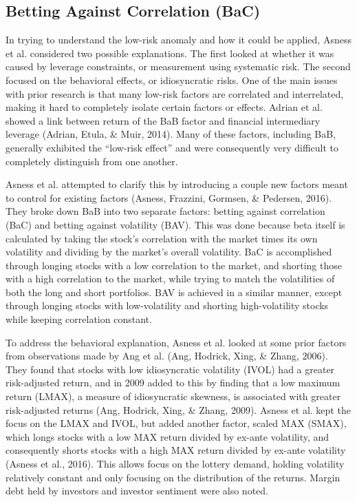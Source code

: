 \documentclass[12pt,twoside]{reedthesis}
\theoremstyle{definition}
\theoremstyle{definition}
\theoremstyle{definition}
\theoremstyle{remark}
\begin{document}
\subsection{Betting Against Correlation
(BaC)}\label{betting-against-correlation-bac}

In trying to understand the low-risk anomaly and how it could be
applied, Asness et al. considered two possible explanations. The first
looked at whether it was caused by leverage constraints, or measurement
using systematic risk. The second focused on the behavioral effects, or
idiosyncratic risks. One of the main issues with prior research is that
many low-risk factors are correlated and interrelated, making it hard to
completely isolate certain factors or effects. Adrian et al. showed a
link between return of the BaB factor and financial intermediary
leverage (Adrian, Etula, \& Muir, 2014). Many of these factors,
including BaB, generally exhibited the ``low-risk effect'' and were
consequently very difficult to completely distinguish from one another.

Asness et al. attempted to clarify this by introducing a couple new
factors meant to control for existing factors (Asness, Frazzini,
Gormsen, \& Pedersen, 2016). They broke down BaB into two separate
factors: betting against correlation (BaC) and betting against
volatility (BAV). This was done because beta itself is calculated by
taking the stock's correlation with the market times its own volatility
and dividing by the market's overall volatility. BaC is accomplished
through longing stocks with a low correlation to the market, and
shorting those with a high correlation to the market, while trying to
match the volatilities of both the long and short portfolios. BAV is
achieved in a similar manner, except through longing stocks with
low-volatility and shorting high-volatility stocks while keeping
correlation constant.

To address the behavioral explanation, Asness et al. looked at some
prior factors from observations made by Ang et al. (Ang, Hodrick, Xing,
\& Zhang, 2006). They found that stocks with low idiosyncratic
volatility (IVOL) had a greater risk-adjusted return, and in 2009 added
to this by finding that a low maximum return (LMAX), a measure of
idiosyncratic skewness, is associated with greater risk-adjusted returns
(Ang, Hodrick, Xing, \& Zhang, 2009). Asness et al. kept the focus on
the LMAX and IVOL, but added another factor, scaled MAX (SMAX), which
longs stocks with a low MAX return divided by ex-ante volatility, and
consequently shorts stocks with a high MAX return divided by ex-ante
volatility (Asness et al., 2016). This allows focus on the lottery
demand, holding volatility relatively constant and only focusing on the
distribution of the returns. Margin debt held by investors and investor
sentiment were also noted.
\end{document}
